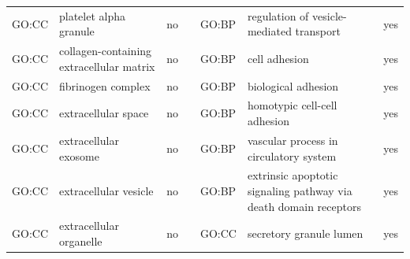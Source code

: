 \begin{longtable}{@{}lp{5cm}lllp{5cm}l@{}}
GO:CC           & platelet alpha granule                                                                                                             & no               &           & GO:BP           & regulation of vesicle-mediated transport                                                                                                                               & yes              \\
GO:CC           & collagen-containing extracellular matrix                                                                                           & no               &           & GO:BP           & cell adhesion                                                                                                                                                          & yes              \\
GO:CC           & fibrinogen complex                                                                                                                 & no               &           & GO:BP           & biological adhesion                                                                                                                                                    & yes              \\
GO:CC           & extracellular space                                                                                                                & no               &           & GO:BP           & homotypic cell-cell adhesion                                                                                                                                           & yes              \\
GO:CC           & extracellular exosome                                                                                                              & no               &           & GO:BP           & vascular process in circulatory system                                                                                                                                 & yes              \\
GO:CC           & extracellular vesicle                                                                                                              & no               &           & GO:BP           & extrinsic apoptotic signaling pathway via death domain receptors                                                                                                       & yes              \\
GO:CC           & extracellular organelle                                                                                                            & no               &           & GO:CC           & secretory granule lumen                                                                                                                                                & yes              \\

\end{longtable}

